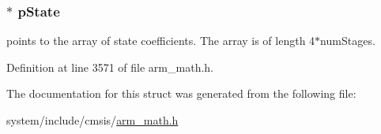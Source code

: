 \subsubsection[{\texorpdfstring{p\+State}{pState}}]{$\ast$ p\+State}\hypertarget{structarm__biquad__cas__df1__32x64__ins__q31_adefeb77301cc04e4d7d22f323029d588}{}\label{structarm__biquad__cas__df1__32x64__ins__q31_adefeb77301cc04e4d7d22f323029d588}
points to the array of state coefficients. The array is of length 4$\ast$num\+Stages. 

Definition at line 3571 of file arm\+\_\+math.\+h.



The documentation for this struct was generated from the following file\+:\begin{DoxyCompactItemize}
\item 
system/include/cmsis/\hyperlink{arm__math_8h}{arm\+\_\+math.\+h}\end{DoxyCompactItemize}
